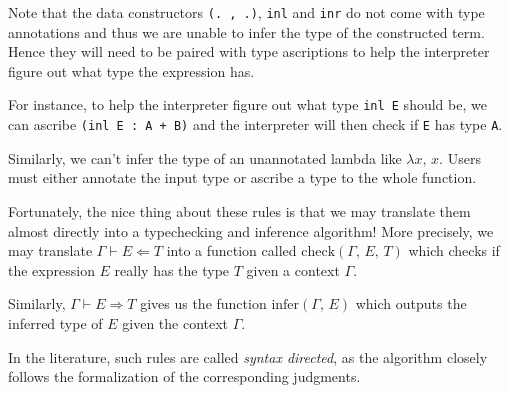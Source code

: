 \documentclass{article}
\begin{document}
Note that the data constructors \verb|(. , .)|, \verb|inl| and \verb|inr| do
not come with type annotations and thus we are unable to infer the type of the
constructed term. Hence they will need to be paired with type ascriptions to
help the interpreter figure out what type the expression has.

For instance, to help the interpreter figure out what type \verb|inl E| should be,
we can ascribe \verb|(inl E : A + B)| and the interpreter will then check if
\verb|E| has type \verb|A|.

Similarly, we can't infer the type of an unannotated lambda like $\lambda x, \, x$.
Users must either annotate the input type or ascribe a type to the whole function.

Fortunately, the nice thing about these rules is that we may translate them almost
directly into a typechecking and inference algorithm!
More precisely, we may translate $\Gamma \vdash E \Leftarrow T$ into a
function called $\text{check}(\Gamma, \, E, \, T)$ which checks if the
expression $E$ really has the type $T$ given a context $\Gamma$.

Similarly, $\Gamma \vdash E \Rightarrow T$ gives us the function
$\text{infer}(\Gamma, \, E)$ which outputs the inferred type of $E$ given
the context $\Gamma$.

In the literature, such rules are called \textit{syntax directed}, as the
algorithm closely follows the formalization of the corresponding judgments.



\end{document}
